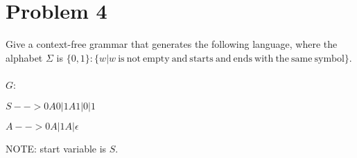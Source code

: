 \documentclass[letterpaper, 11pt]{article}
\begin{document}
\section*{Problem 4}
Give a context-free grammar that generates the following language, where the alphabet $\Sigma$ is $\{ 0,1 \} : \{ w | w \mathrm { ~ i s ~ n o t ~ e m p t y ~ a n d ~ s t a r t s ~ a n d ~ e n d s ~ w i t h ~ t h e ~ s a m e ~ s y m b o l \} . ~ }$\\\\
$G$:

$S --> 0A0 | 1A1 | 0 | 1$

$A --> 0A | 1A | \epsilon$ 

NOTE: start variable is $S$.
\newpage
\end{document}
